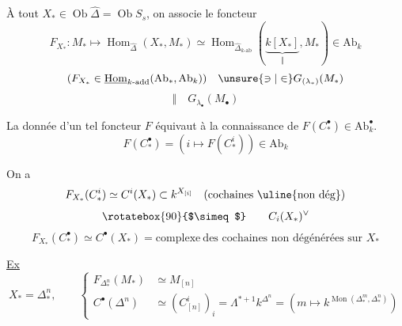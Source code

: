 
À tout $X_*\in\operatorname{Ob}\widehat\Delta=\operatorname{Ob}S_s$,
on associe le foncteur
\[
F_{X_*}:M_*\longmapsto\operatorname{Hom}_{\widehat\Delta}(X_*,M_*)
\simeq\operatorname{Hom}_{\widehat\Delta_{k\text{-ab}}}
(\underbrace{k[X_*]}_{\Vert},M_*)\in\mathrm{Ab}_k
\]
\[
(F_{X_*}\in\underline{\operatorname{Hom}}_{k\text{-add}}(\mathrm{Ab}_*,\mathrm{Ab}_k))
\quad\unsure{\ni|\in}G_{(\lambda_*)}(M_*)
\]
\[
\Vert\quad G_{\lambda_\bullet}(M_\bullet)
\]

La donnée d'un tel foncteur $F$ 
équivaut à la connaissance de $F(C_*^\bullet)\in\mathrm{Ab}_k^\bullet$.
\[
F(C_*^\bullet)=(i\longmapsto F(C_*^i))\in\mathrm{Ab}_k
\]

On a
\[
F_{X_*}(C_*^i)\simeq C^i(X_*)\subset k^{X_{[i]}}
\quad(\text{cochaines \uline{non dég}})
\]
\[
\rotatebox{90}{$\simeq$}\qquad C_i(X_*)^\vee
\]
\[
F_{X_*}(C_*^\bullet)\simeq C^\bullet(X_*)
=\text{complexe}\ \text{des cochaines non dégénérées sur }X_*
\]

\uline{Ex}
\[
X_* =\Delta_*^n,\qquad
\left\{\begin{aligned}
F_{\Delta_*^n}(M_*)&\simeq M_{[n]}\\
C^\bullet(\Delta^n)&\simeq(C_{[n]}^i)_i
=\Lambda^{*+1}k^{\Delta^n}
=(m\longmapsto k^{\operatorname{Mon}(\Delta_*^m,\Delta_*^n)})
\end{aligned}\right.
\]

